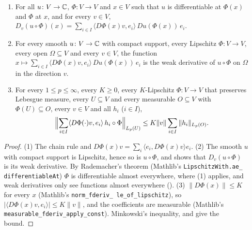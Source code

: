 \begin{lemma}
\label{lem:chain-rule-smooth}
\leanok
{}
\begin{enumerate}
  \item For all $u \colon V \to \mathbb{C}$, $\Phi \colon V \to V$ and $x \in V$ such that $u$ is
    differentiable at $\Phi(x)$ and $\Phi$ at $x$, and for every $v \in V$,
    $D_v (u \circ \Phi)(x) = \sum_{i \in I} \langle D\Phi(x) v, e_i \rangle \,
    Du(\Phi(x)) \, e_i$.
  \item For every smooth $u \colon V \to \mathbb{C}$ with compact support, every Lipschitz
    $\Phi \colon V \to V$, every open $\Omega \subseteq V$ and every $v \in V$, the function
    $x \mapsto \sum_{i \in I} \langle D\Phi(x) v, e_i \rangle \, Du(\Phi(x)) \, e_i$ is the weak
    derivative of $u \circ \Phi$ on $\Omega$ in the direction $v$.
  \item For every $1 \leq p \leq \infty$, every $K \geq 0$, every $K$-Lipschitz
    $\Phi \colon V \to V$ that preserves Lebesgue measure, every $U \subseteq V$ and every
    measurable $O \subseteq V$ with $\Phi(U) \subseteq O$, every $v \in V$ and all $h_i$
    ($i \in I$),
    \[
      \Bigl\| \sum_{i \in I} \langle D\Phi(\cdot) v, e_i \rangle \, h_i \circ \Phi
      \Bigr\|_{L_p(U)} \leq K \|v\| \sum_{i \in I} \|h_i\|_{L_p(O)} .
    \]
\end{enumerate}
\end{lemma}

\begin{proof}
\leanok
(1) The chain rule and $D\Phi(x) v = \sum_i \langle e_i, D\Phi(x) v \rangle e_i$. (2) The smooth
$u$ with compact support is Lipschitz, hence so is $u \circ \Phi$, and
 shows that $D_v (u \circ \Phi)$ is its weak derivative. By
Rademacher's theorem (Mathlib's \texttt{LipschitzWith.\allowbreak ae\_\allowbreak
differentiableAt}) $\Phi$ is differentiable almost everywhere, where (1) applies, and weak
derivatives only see functions almost everywhere ().
(3) $\|D\Phi(x)\| \leq K$ for every $x$ (Mathlib's \texttt{norm\_\allowbreak fderiv\_\allowbreak
le\_\allowbreak of\_\allowbreak lipschitz}), so
$|\langle D\Phi(x) v, e_i \rangle| \leq K \|v\|$, and the coefficients are measurable (Mathlib's
\texttt{measurable\_\allowbreak fderiv\_\allowbreak apply\_\allowbreak const}). Minkowski's
inequality,  and  give
the bound.
\end{proof}


